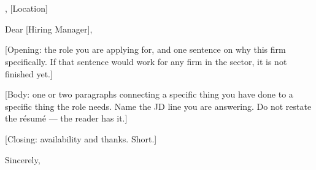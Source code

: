 \documentclass[a4paper,11pt]{article}
\begin{document}
\HeaderBlock

\vspace{1em}
\noindent [Date] \\
 \\
\noindent [Company], [Location]

\vspace{1em}
\noindent Dear [Hiring Manager],

\vspace{0.5em}
[Opening: the role you are applying for, and one sentence on why this firm
specifically. If that sentence would work for any firm in the sector, it is not
finished yet.]

[Body: one or two paragraphs connecting a specific thing you have done to a
specific thing the role needs. Name the JD line you are answering. Do not
restate the résumé — the reader has it.]

[Closing: availability and thanks. Short.]

\vspace{0.5em}
\noindent Sincerely, \\
\noindent \CandidateName
\end{document}
